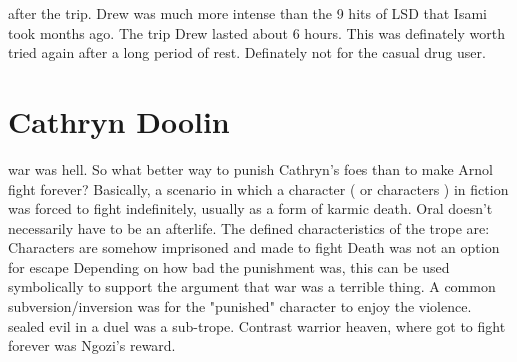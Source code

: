 \documentclass[12pt]{book}
\begin{document}
after the trip. Drew was much more intense than the 9 hits of LSD that Isami took months ago. The trip Drew lasted about 6 hours. This was definately worth tried again after a long period of rest. Definately not for the casual drug user.



\chapter{Cathryn Doolin}

war was hell. So what better way to punish Cathryn's foes than to make Arnol fight forever? Basically, a scenario in which a character ( or characters ) in fiction was forced to fight indefinitely, usually as a form of karmic death. Oral doesn't necessarily have to be an afterlife. The defined characteristics of the trope are: Characters are somehow imprisoned and made to fight Death was not an option for escape Depending on how bad the punishment was, this can be used symbolically to support the argument that war was a terrible thing. A common subversion/inversion was for the "punished" character to enjoy the violence. sealed evil in a duel was a sub-trope. Contrast warrior heaven, where got to fight forever was Ngozi's reward.
\end{document}
